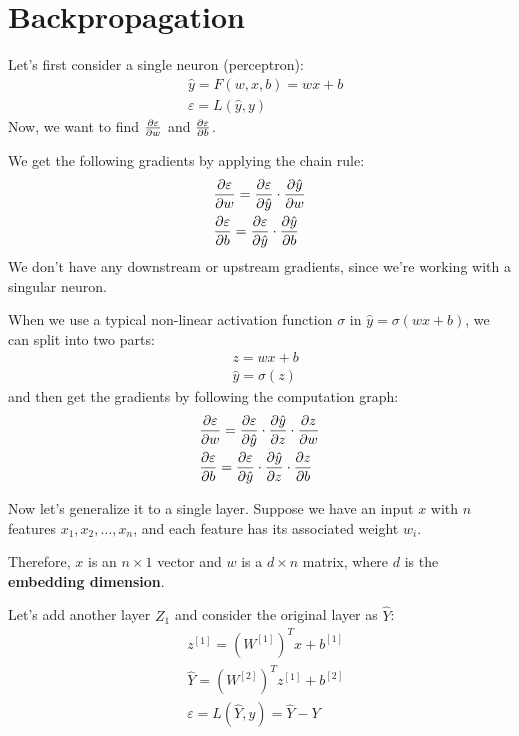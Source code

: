 \section{Backpropagation}
Let's first consider a single neuron (perceptron):
\begin{align*}
    & \hat{y} = F(w, x, b) = wx + b \\
    & \varepsilon = L(\hat{y}, y)    
\end{align*}
Now, we want to find $\frac{\partial \varepsilon}{\partial w}$ and $\frac{\partial \varepsilon}{\partial b}$.

We get the following gradients by applying the chain rule:
\begin{align*}
    & \frac{\partial \varepsilon}{\partial w}
    = \frac{\partial \varepsilon}{\partial \hat{y}} \cdot \frac{\partial \hat{y}}{\partial w} \\
    & \frac{\partial \varepsilon}{\partial b}
    = \frac{\partial \varepsilon}{\partial \hat{y}} \cdot \frac{\partial \hat{y}}{\partial b}
\end{align*}
We don't have any downstream or upstream gradients, since we're working with a singular neuron.

When we use a typical non-linear activation function $\sigma$ in $\hat{y} = \sigma(wx + b)$,
we can split into two parts:
\begin{align*}
    & z = wx + b \\
    & \hat{y} = \sigma(z)
\end{align*}
and then get the gradients by following the computation graph:
\begin{align*}
    & \frac{\partial \varepsilon}{\partial w}
    = \frac{\partial \varepsilon}{\partial \hat{y}}
    \cdot \frac{\partial \hat{y}}{\partial z}
    \cdot \frac{\partial z}{\partial w} \\
    & \frac{\partial \varepsilon}{\partial b}
    = \frac{\partial \varepsilon}{\partial \hat{y}}
    \cdot \frac{\partial \hat{y}}{\partial z}
    \cdot \frac{\partial z}{\partial b}
\end{align*}

Now let's generalize it to a single layer. Suppose we have an input $x$ with $n$ features
$x_1, x_2, \dots, x_n$, and each feature has its associated weight $w_i$.

Therefore, $x$ is an $n \times 1$ vector and $w$ is a $d \times n$ matrix, where $d$
is the \textbf{embedding dimension}.

Let's add another layer $Z_1$ and consider the original layer as $\hat{Y}$:
\begin{align*}
    & z^{[1]} = (W^{[1]})^T x + b^{[1]} \\
    & \hat{Y} = (W^{[2]})^T z^{[1]} + b^{[2]} \\
    & \varepsilon = L(\hat{Y}, y) = \hat{Y} - Y
\end{align*}

